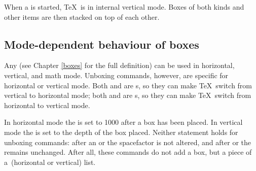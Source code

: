 \documentclass[twoside,letterpaper,openright]{rapport3}
\begin{document}
When a  is started, \TeX\ is in internal vertical mode.
Boxes of both kinds and other items are then stacked
on top of each other.


\subsection{Mode-dependent behaviour of boxes}

Any  (see Chapter \ref{boxes} for the full definition)
can be used in horizontal, vertical, and math mode.
Unboxing commands, however, are specific for horizontal or vertical mode.
Both  and  are s,
so they can make \TeX\ switch from vertical to horizontal
mode; 
both  and  are s,
so they can make \TeX\ switch from horizontal to vertical
mode.

In horizontal mode the  is set to 1000
after a box has been placed. In vertical mode the
 is set to the depth of the box placed.
Neither statement holds for
unboxing commands: after an  or  the 
spacefactor is not altered, and after  or 
the  remains unchanged.
After all, these commands do not add a box,
but a piece of a~(horizontal or vertical) list.
\end{document}
